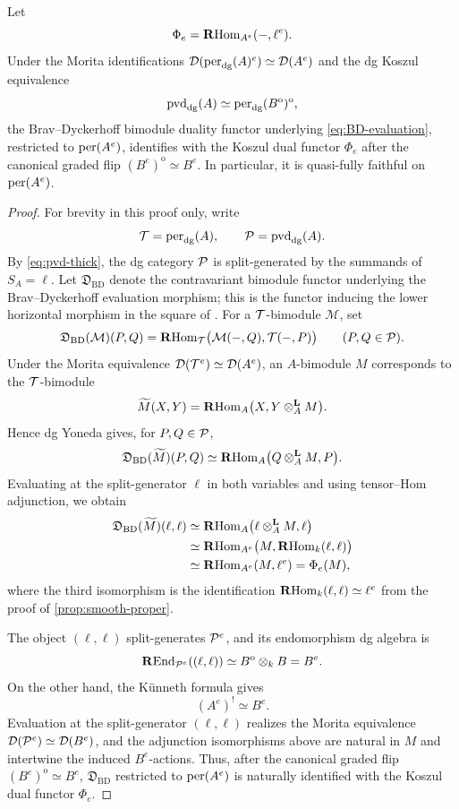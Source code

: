 \documentclass[11pt,a4paper,dvipsnames,x11names]{amsart}
\begin{document}
\begin{lem}\label{lem:enveloping-Morita-duality}
Let
\[
\Phi_e=\operatorname{\mathbf{R}Hom}_{A^e}(-,\ell^e).
\]
Under the Morita identifications $\mathcal D(\operatorname{per}_{\mathrm{dg}}(A)^e)\simeq \mathcal D(A^e)$ and the dg Koszul equivalence
\[
\operatorname{pvd}_{\mathrm{dg}}(A)\simeq\operatorname{per}_{\mathrm{dg}}(B^{\mathrm{o}})^{\mathrm{o}},
\]
the Brav--Dyckerhoff bimodule duality functor underlying \eqref{eq:BD-evaluation}, restricted to $\operatorname{per}(A^e)$, identifies with the Koszul dual functor $\Phi_e$ after the canonical graded flip $(B^e)^{\mathrm{o}}\simeq B^e$. In particular, it is quasi-fully faithful on $\operatorname{per}(A^e)$.
\end{lem}

\begin{proof}
For brevity in this proof only, write
\[
\mathcal T=\operatorname{per}_{\mathrm{dg}}(A),\qquad \mathcal P=\operatorname{pvd}_{\mathrm{dg}}(A).
\]
By \eqref{eq:pvd-thick}, the dg category $\mathcal P$ is split-generated by the summands of $S_A=\ell$. Let $\mathfrak D_{\mathrm{BD}}$ denote the contravariant bimodule functor underlying the Brav--Dyckerhoff evaluation morphism; this is the functor inducing the lower horizontal morphism in the square of \cite[Theorem~3.1]{BravDyckerhoff19}. For a $\mathcal T$-bimodule $\mathcal M$, set
\[
\mathfrak D_{\mathrm{BD}}(\mathcal M)(P,Q)
=
\operatorname{\mathbf{R}Hom}_{\mathcal T}\bigl(\mathcal M(-,Q),\mathcal T(-,P)\bigr)
\qquad(P,Q\in\mathcal P).
\]
Under the Morita equivalence $\mathcal D(\mathcal T^e)\simeq \mathcal D(A^e)$, an $A$-bimodule $M$ corresponds to the $\mathcal T$-bimodule
\[
\widetilde M(X,Y)
=
\operatorname{\mathbf{R}Hom}_A\bigl(X,Y\otimes_A^{\mathbf L}M\bigr).
\]
Hence dg Yoneda gives, for $P,Q\in\mathcal P$,
\[
\mathfrak D_{\mathrm{BD}}(\widetilde M)(P,Q)
\simeq
\operatorname{\mathbf{R}Hom}_A\bigl(Q\otimes_A^{\mathbf L}M,P\bigr).
\]
Evaluating at the split-generator $\ell$ in both variables and using tensor--Hom adjunction, we obtain
\[
\begin{aligned}
\mathfrak D_{\mathrm{BD}}(\widetilde M)(\ell,\ell)
&\simeq
\operatorname{\mathbf{R}Hom}_A\bigl(\ell\otimes_A^{\mathbf L}M,\ell\bigr)\\
&\simeq
\operatorname{\mathbf{R}Hom}_{A^e}\bigl(M,\operatorname{\mathbf{R}Hom}_k(\ell,\ell)\bigr)\\
&\simeq
\operatorname{\mathbf{R}Hom}_{A^e}(M,\ell^e)
=
\Phi_e(M),
\end{aligned}
\]
where the third isomorphism is the identification $\operatorname{\mathbf{R}Hom}_k(\ell,\ell)\simeq\ell^e$ from the proof of \cref{prop:smooth-proper}.

The object $(\ell,\ell)$ split-generates $\mathcal P^e$, and its endomorphism dg algebra is
\[
\operatorname{\mathbf{R}End}_{\mathcal P^e}((\ell,\ell))
\simeq
B^{\mathrm{o}}\otimes_k B
=
B^e.
\]
On the other hand, the K\"unneth formula gives
\[
(A^e)^!\simeq B^e.
\]
Evaluation at the split-generator $(\ell,\ell)$ realizes the Morita equivalence $\mathcal D(\mathcal P^e)\simeq\mathcal D(B^e)$, and the adjunction isomorphisms above are natural in $M$ and intertwine the induced $B^e$-actions. Thus, after the canonical graded flip $(B^e)^{\mathrm{o}}\simeq B^e$, $\mathfrak D_{\mathrm{BD}}$ restricted to $\operatorname{per}(A^e)$ is naturally identified with the Koszul dual functor $\Phi_e$.


\end{proof}
\end{document}
